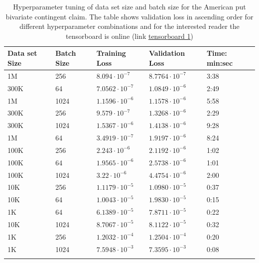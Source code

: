 \begin{table}[th]
\caption{Hyperparameter tuning of data set size and batch size for the American put bivariate contingent claim. The table shows validation loss in ascending order for different hyperparameter combinations and for the interested reader the tensorboard is online (link \href{https://tensorboard.dev/experiment/8pxUoSDmTVGMOxpJWgiZsA/}{tensorboard 1})}
\label{tab:hyperEuroC1}
\centering
\begin{tabular}{lllll}
\toprule
\textbf{Data set Size} & \textbf{Batch Size} & \textbf{Training Loss} & \textbf{Validation Loss} & \textbf{Time: min:sec}\\
\midrule
1M    & 256   & $8.094\cdot 10^{-7}$ & $8.7764\cdot 10^{-7}$ & 3:38 \\ 
300K  & 64    & $7.0562\cdot 10^{-7}$ & $1.0849\cdot 10^{-6}$ & 2:49 \\ 
1M    & 1024  & $1.1596\cdot 10^{-6}$ & $1.1578\cdot 10^{-6}$ & 5:58 \\ 
300K  & 256   & $9.579\cdot 10^{-7}$ & $1.3268\cdot 10^{-6}$ & 2:29 \\ 
300K  & 1024  & $1.5367\cdot 10^{-6}$ & $1.4138\cdot 10^{-6}$ & 9:28 \\ 
1M   & 64    & $3.4919\cdot 10^{-7}$ & $1.9197\cdot 10^{-6}$ & 8:24\\ 
100K  & 256   & $2.243\cdot 10^{-6}$ & $2.1192\cdot 10^{-6}$ & 1:02  \\ 
100K  & 64    & $1.9565\cdot 10^{-6}$ & $2.5738\cdot 10^{-6}$ & 1:01 \\ 
100K  & 1024  & $3.22\cdot 10^{-6}$ & $4.4754\cdot 10^{-6}$ & 2:00\\ 
10K  & 256   & $1.1179\cdot 10^{-5}$ & $1.0980\cdot 10^{-5}$ & 0:37 \\ 
10K   & 64    & $1.0043\cdot 10^{-5}$ & $1.9830\cdot 10^{-5}$ & 0:15 \\ 
1K   & 64    & $6.1389\cdot 10^{-5}$ & $7.8711\cdot 10^{-5}$ & 0:22\\ 
10K   & 1024 & $8.7067\cdot 10^{-5}$ & $8.1122\cdot 10^{-5}$ & 0:32  \\ 
1K   & 256   & $1.2032\cdot 10^{-4}$ & $1.2504\cdot 10^{-4}$ & 0:20    \\ 
1K    & 1024  & $7.5948\cdot 10^{-3}$ & $7.3595\cdot 10^{-3}$ & 0:08    \\ 
\bottomrule\\
\end{tabular}
\end{table}

